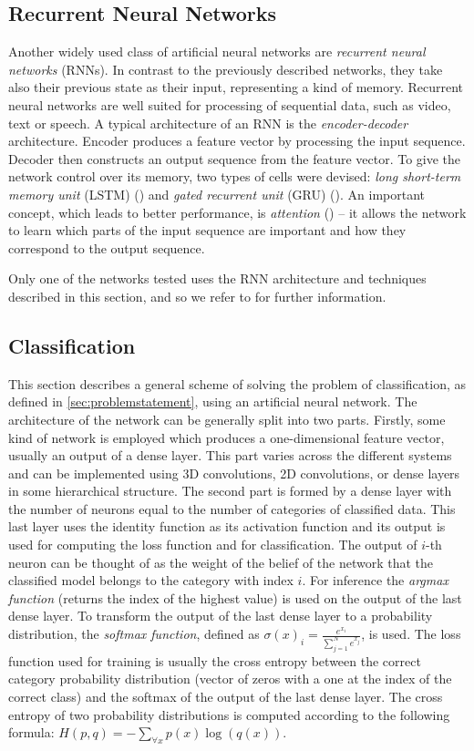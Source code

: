 \subsection{Recurrent Neural Networks}
\label{sec:rnns}
Another widely used class of artificial neural networks are \textit{recurrent neural networks} (RNNs). In contrast to the previously described networks, they take  also their previous state as their input, representing a kind of memory. Recurrent neural networks are well suited for processing of sequential data, such as video, text or speech. A typical architecture of an RNN is the \textit{encoder-decoder} architecture. Encoder produces a feature vector by processing the input sequence. Decoder then constructs an output sequence from the feature vector. To give the network control over its memory, two types of cells were devised: \textit{long short-term memory unit} (LSTM) (\cite{hochreiter_long_1997}) and \textit{gated recurrent unit} (GRU) (\cite{cho_learning_2014}). An important concept, which leads to better performance, is \textit{attention} (\cite{bahdanau_neural_2014}) -- it allows the network to learn which parts of the input sequence are important and how they correspond to the output sequence.\par
Only one of the networks tested uses the RNN architecture and techniques described in this section, and  so we refer to \cite{goodfellow_deep_2016} for further information. 

\subsection{Classification}
This section describes a general scheme of solving the problem of classification, as defined in \autoref{sec:problemstatement}, using an artificial neural network. The architecture of the network can be generally split into two parts. Firstly, some kind of network is employed which produces a one-dimensional feature vector, usually an output of a dense layer. This part varies across the different systems and can be implemented using 3D convolutions, 2D convolutions, or dense layers in some hierarchical structure.
The second part is formed by a dense layer with the number of neurons equal to the number of categories of classified data. This last layer uses the identity function as its activation function and its output is used for computing the loss function and for classification. The output of $i$-th neuron can be thought of as the weight of the belief of the network that the classified model belongs to the category with index $i$. For inference the \textit{argmax function} (returns the index of the highest value) is used on the output of the last dense layer. To transform the output of the last dense layer to a probability distribution, the \textit{softmax function}, defined as $\sigma(x)_i = \frac{e^{x_i}}{\sum_{j=1}^{N}{e^{x_j}}} $, is used. The loss function used for training is usually the cross entropy between the correct category probability distribution (vector of zeros with a one at the index of the correct class) and the softmax of the output of the last dense layer. The cross entropy of two probability distributions is computed according to the following formula: $H(p,q) = - \sum_{\forall x}{p(x)\log(q(x))}$. 

